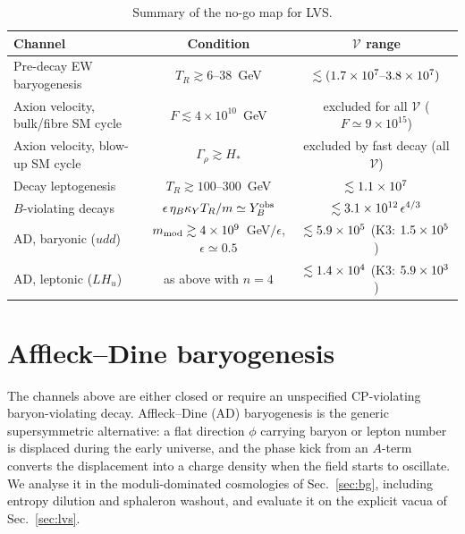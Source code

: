 \documentclass[11pt]{article}
\newcommand{\Yobs}{Y_B^{\rm obs}}
\begin{document}
\begin{table}[t]
\centering\small
\begin{tabular}{lcc}
\toprule
Channel & Condition & $\mathcal V$ range\\
\midrule
Pre-decay EW baryogenesis & $T_R\gtrsim6$--$38$~GeV & $\lesssim(1.7\times10^{7}\text{--}3.8\times10^{7})$\\
Axion velocity, bulk/fibre SM cycle & $F\lesssim4\times10^{10}$~GeV & excluded for all $\mathcal V$ ($F\simeq9\times10^{15}$)\\
Axion velocity, blow-up SM cycle & $\Gamma_\rho\gtrsim H_*$ & excluded by fast decay (all $\mathcal V$)\\
Decay leptogenesis & $T_R\gtrsim100$--$300$~GeV & $\lesssim1.1\times10^{7}$\\
$B$-violating decays & $\epsilon\,\eta_B\kappa_YT_R/m\simeq\Yobs$ & $\lesssim3.1\times10^{12}\,\epsilon^{4/3}$\\
AD, baryonic ($udd$) & $m_{\rm mod}\gtrsim4\times10^{9}$~GeV$/\epsilon$, $\epsilon\simeq0.5$ & $\lesssim5.9\times10^{5}$ (K3: $1.5\times10^{5}$)\\
AD, leptonic ($LH_u$) & as above with $n=4$ & $\lesssim1.4\times10^{4}$ (K3: $5.9\times10^{3}$)\\
\bottomrule
\end{tabular}
\caption{Summary of the no-go map for LVS.}
\end{table}

\section{Affleck--Dine baryogenesis}\label{sec:ad}
The channels above are either closed or require an unspecified CP-violating baryon-violating decay. Affleck--Dine (AD) baryogenesis is the generic supersymmetric alternative: a flat direction $\phi$ carrying baryon or lepton number is displaced during the early universe, and the phase kick from an $A$-term converts the displacement into a charge density when the field starts to oscillate. We analyse it in the moduli-dominated cosmologies of Sec.~\ref{sec:bg}, including entropy dilution and sphaleron washout, and evaluate it on the explicit vacua of Sec.~\ref{sec:lvs}.
\end{document}
